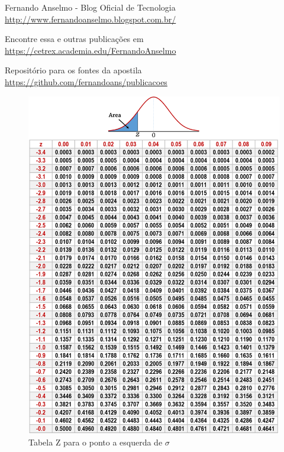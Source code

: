 \documentclass[a4paper,11pt]{article}
\begin{document}

\begin{thebibliography}{3}
	Fernando Anselmo - Blog Oficial de Tecnologia \\
	\url{http://www.fernandoanselmo.blogspot.com.br/}
	
	Encontre essa e outras publicações em \\
	\url{https://cetrex.academia.edu/FernandoAnselmo}

	Repositório para os fontes da apostila \\
	\url{https://github.com/fernandoans/publicacoes}	
\end{thebibliography}

\newpage
\begin{figure}[!htb]
	\centering
	\includegraphics[width=1.0\textwidth]{imagens/ztable.png}
	\caption{Tabela Z para o ponto a esquerda de $\sigma$}
\end{figure}
\end{document}
